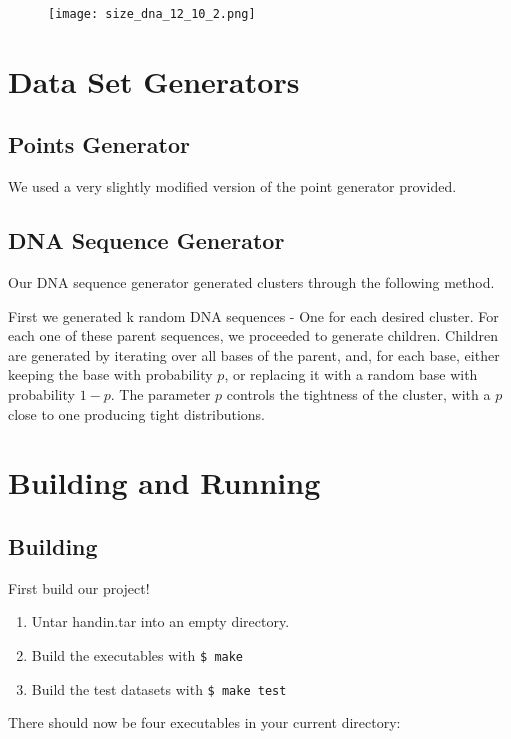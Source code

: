 \documentclass[12pt]{article}
\begin{document}
\begin{figure}[H]
\centering
\texttt{[image: size\_dna\_12\_10\_2.png]}
\end{figure}

\section{Data Set Generators}

\subsection{Points Generator}

We used a very slightly modified version of the point generator provided.

\subsection{DNA Sequence Generator}

Our DNA sequence generator generated clusters through the following method.

First we generated k random DNA sequences - One for each desired cluster. For each one of these parent sequences, we proceeded to generate children. Children are generated by iterating over all bases of the parent, and, for each base, either keeping the base with probability $p$, or replacing it with a random base with probability $1-p$. The parameter $p$ controls the tightness of the cluster, with a $p$ close to one producing tight distributions.

\section{Building and Running}
 
\subsection{Building}

First build our project!

\begin{enumerate}
\item Untar handin.tar into an empty directory.
\item Build the executables with \texttt{\$ make}
\item Build the test datasets with \texttt{\$ make test}
\end{enumerate}

There should now be four executables in your current directory: 
\end{document}
